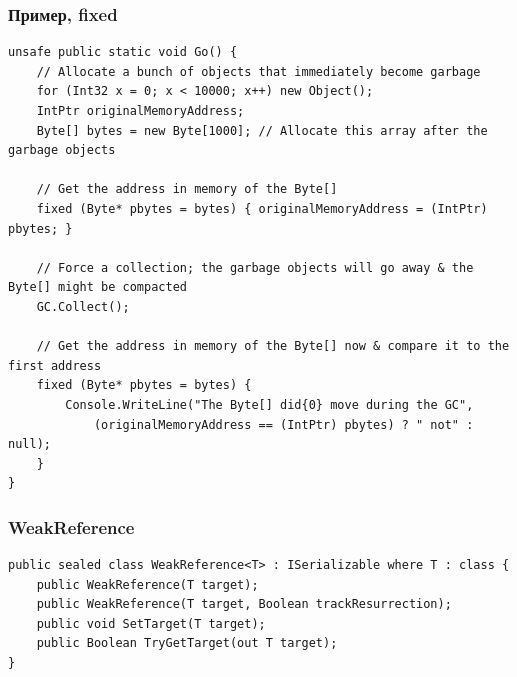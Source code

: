 \documentclass[xetex,mathserif,serif]{beamer}
\begin{document}
    \begin{frame}[fragile]
        \frametitle{Пример, fixed}
        \begin{scriptsize}
            \begin{verbatim}
unsafe public static void Go() {
    // Allocate a bunch of objects that immediately become garbage
    for (Int32 x = 0; x < 10000; x++) new Object();
    IntPtr originalMemoryAddress;
    Byte[] bytes = new Byte[1000]; // Allocate this array after the garbage objects

    // Get the address in memory of the Byte[]
    fixed (Byte* pbytes = bytes) { originalMemoryAddress = (IntPtr) pbytes; }

    // Force a collection; the garbage objects will go away & the Byte[] might be compacted
    GC.Collect();

    // Get the address in memory of the Byte[] now & compare it to the first address
    fixed (Byte* pbytes = bytes) {
        Console.WriteLine("The Byte[] did{0} move during the GC",
            (originalMemoryAddress == (IntPtr) pbytes) ? " not" : null);
    }
}
            \end{verbatim}
        \end{scriptsize}
    \end{frame}

    \begin{frame}[fragile]
        \frametitle{WeakReference}
        \begin{scriptsize}
            \begin{verbatim}
public sealed class WeakReference<T> : ISerializable where T : class {
    public WeakReference(T target);
    public WeakReference(T target, Boolean trackResurrection);
    public void SetTarget(T target);
    public Boolean TryGetTarget(out T target);
}
            \end{verbatim}
        \end{scriptsize}
    \end{frame}
\end{document}

